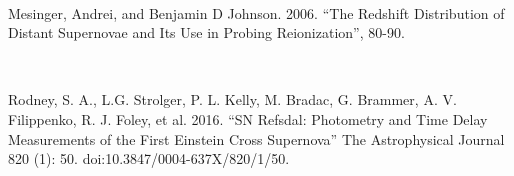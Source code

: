 \

Mesinger, Andrei, and Benjamin D Johnson. 2006. ``The Redshift Distribution of Distant Supernovae and Its Use in Probing Reionization'', 80-90.

\

Rodney, S. A., L.G. Strolger, P. L. Kelly, M. Bradac, G. Brammer, A. V. Filippenko, R. J. Foley, et al. 2016. ``SN Refsdal: Photometry and Time Delay Measurements of the First Einstein Cross Supernova'' The Astrophysical Journal 820 (1): 50. doi:10.3847/0004-637X/820/1/50.







